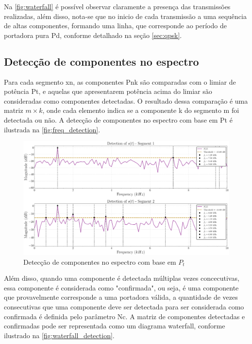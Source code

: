 Na \ref{fig:waterfall} é possível observar claramente a presença das transmissões realizadas, além disso, nota-se que no inicio de cada transmissão a uma sequência de altas componentes, formando uma linha, que corresponde ao período de portadora pura \gls{Pd}, conforme detalhado na seção \ref{sec:qpsk}.

\subsection{Detecção de componentes no espectro}\label{sec:comparacao_potencia}

Para cada segmento \gls{xn}, as componentes \gls{Pnk} são comparadas com o limiar de potência \gls{Pt}, e aquelas que apresentarem potência acima do limiar são consideradas como componentes detectadas. O resultado dessa comparação é uma matriz $m \times k$, onde cada elemento indica se a componente \gls{k} do segmento \gls{m} foi detectada ou não. A detecção de componentes no espectro com base em \gls{Pt} é ilustrada na \autoref{fig:freq_detection}.

\begin{figure}[H]
	\centering
	\caption{Detecção de componentes no espectro com base em $P_t$}\label{fig:freq_detection}
	\includegraphics[width=\linewidth]{assets/cap3/example_detector_freq.pdf}
\end{figure}

Além disso, quando uma componente é detectada múltiplas vezes concecutivas, essa componente é considerada como "confirmada", ou seja, é uma componente que provavelmente corresponde a uma portadora válida, a quantidade de vezes consecutivas que uma componente deve ser detectada para ser considerada como confirmada é definida pelo parâmetro \gls{Nc}. A matriz de componentes detectadas e confirmadas pode ser representada como um diagrama waterfall, conforme ilustrado na \autoref{fig:waterfall_detection}.

